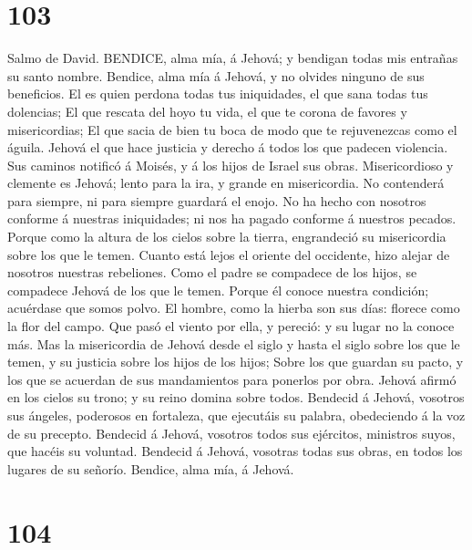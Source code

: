 \hypertarget{section-102}{%
\section{103}\label{section-102}}

 Salmo de David. BENDICE, alma mía, á Jehová; y bendigan
todas mis entrañas su santo nombre.  Bendice, alma mía á
Jehová, y no olvides ninguno de sus beneficios.  El es quien
perdona todas tus iniquidades, el que sana todas tus dolencias;
 El que rescata del hoyo tu vida, el que te corona de
favores y misericordias;  El que sacia de bien tu boca de
modo que te rejuvenezcas como el águila.  Jehová el que hace
justicia y derecho á todos los que padecen violencia.  Sus
caminos notificó á Moisés, y á los hijos de Israel sus obras.
 Misericordioso y clemente es Jehová; lento para la ira, y
grande en misericordia.  No contenderá para siempre, ni para
siempre guardará el enojo.  No ha hecho con nosotros
conforme á nuestras iniquidades; ni nos ha pagado conforme á nuestros
pecados.  Porque como la altura de los cielos sobre la
tierra, engrandeció su misericordia sobre los que le temen.
 Cuanto está lejos el oriente del occidente, hizo alejar de
nosotros nuestras rebeliones.  Como el padre se compadece
de los hijos, se compadece Jehová de los que le temen. 
Porque él conoce nuestra condición; acuérdase que somos polvo.
 El hombre, como la hierba son sus días: florece como la
flor del campo.  Que pasó el viento por ella, y pereció: y
su lugar no la conoce más.  Mas la misericordia de Jehová
desde el siglo y hasta el siglo sobre los que le temen, y su justicia
sobre los hijos de los hijos;  Sobre los que guardan su
pacto, y los que se acuerdan de sus mandamientos para ponerlos por obra.
 Jehová afirmó en los cielos su trono; y su reino domina
sobre todos.  Bendecid á Jehová, vosotros sus ángeles,
poderosos en fortaleza, que ejecutáis su palabra, obedeciendo á la voz
de su precepto.  Bendecid á Jehová, vosotros todos sus
ejércitos, ministros suyos, que hacéis su voluntad. 
Bendecid á Jehová, vosotras todas sus obras, en todos los lugares de su
señorío. Bendice, alma mía, á Jehová.

\hypertarget{section-103}{%
\section{104}\label{section-103}}

